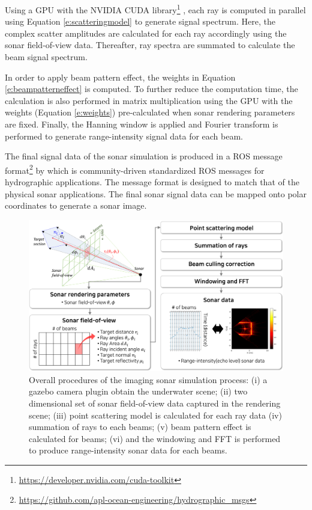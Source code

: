 \documentclass[utf8]{frontiersSCNS} %
\begin{document}
Using a GPU with the NVIDIA CUDA library\footnote{\url{https://developer.nvidia.com/cuda-toolkit}} \citep{cuda}, each ray is computed in parallel using Equation \ref{e:scatteringmodel} to generate signal spectrum. Here, the complex scatter amplitudes are calculated for each ray accordingly using the sonar field-of-view data. Thereafter, ray spectra are summated to calculate the beam signal spectrum.

In order to apply beam pattern effect, the weights in Equation \ref{e:beampatterneffect} is computed. To further reduce the computation time, the calculation is also performed in matrix multiplication using the GPU with the weights (Equation \ref{e:weights}) pre-calculated when sonar rendering parameters are fixed. Finally, the Hanning window is applied and Fourier transform is performed to generate range-intensity signal data for each beam. 

The final signal data of the sonar simulation is produced in a ROS message format\footnote{\url{https://github.com/apl-ocean-engineering/hydrographic_msgs}} by \cite{acousticmsgformat} which is community-driven standardized ROS messages for hydrographic applications. The message format is designed to match that of the physical sonar applications. The final sonar signal data can be mapped onto polar coordinates to generate a sonar image.

\begin{figure}
  \centering
  \includegraphics[width=\textwidth]{images/implementation.png}
  \caption{Overall procedures of the imaging sonar simulation process: (i) a gazebo camera plugin obtain the underwater scene; (ii) two dimensional set of sonar field-of-view data captured in the rendering scene; (iii) point scattering model is calculated for each ray data (iv) summation of rays to each beams; (v) beam pattern effect is calculated for beams; (vi) and the windowing and FFT is performed to produce range-intensity sonar data for each beams.}
  \label{f:implementation}
\end{figure} 
\end{document}
